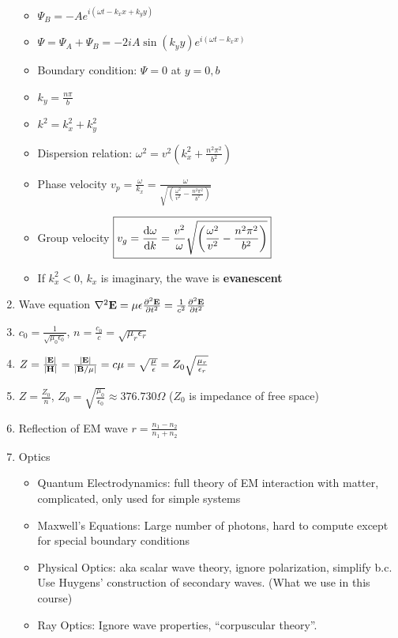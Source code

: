 \documentclass{article}
\theoremstyle{remark}
\theoremstyle{remark}
\begin{document}
\begin{enumerate}
\begin{itemize}
            \item $\Psi_B=-Ae^{i(\omega t-k_x x+k_y y)}$
            \item $\Psi=\Psi_A+\Psi_B=-2iA\sin(k_y y)e^{i(\omega t-k_x x)}$
            \item Boundary condition: $\Psi=0$ at $y=0,b$
            \item $k_y=\frac{n\pi}{b}$
            \item $k^2=k_x^2+k_y^2$
            \item Dispersion relation: $\boxed{\omega^2=v^2\left(k_x^2+\frac{n^2\pi^2}{b^2}\right)}$
            \item Phase velocity $\boxed{v_p=\frac{\omega}{k_x}=\frac{\omega}{\sqrt{\left(\frac{\omega^2}{v^2}-\frac{n^2\pi^2}{b^2}\right)}}}$
            \item Group velocity $\boxed{v_g=\dv{\omega}{k}=\frac{v^2}{\omega}\sqrt{\left(\frac{\omega^2}{v^2}-\frac{n^2\pi^2}{b^2}\right)}}$
            \item If $k_x^2<0$, $k_x$ is imaginary, the wave is \textbf{evanescent}
        \end{itemize}
    \item Wave equation $\laplacian{\vb{E}}=\mu\epsilon\pdv[2]{\vb{E}}{t}=\frac{1}{c^2}\pdv[2]{\vb{E}}{t}$
    \item $c_0=\frac{1}{\sqrt{\mu_0\epsilon_0}}$, $n=\frac{c_0}{c}=\sqrt{\mu_r\epsilon_r}$
    \item $Z=\frac{|\vb{E}|}{|\vb{H}|}=\frac{|\vb{E}|}{|\vb{B}/\mu|}=c\mu=\sqrt{\frac{\mu}{\epsilon}}=Z_0\sqrt{\frac{\mu_r}{\epsilon_r}}$
    \item $\boxed{Z=\frac{Z_0}{n}}$, $\boxed{Z_0=\sqrt{\frac{\mu_0}{\epsilon_0}}}\approx 376.730\Omega$ ($Z_0$ is impedance of free space)
    \item Reflection of EM wave $r=\frac{n_1-n_2}{n_1+n_2}$
    \item Optics\begin{itemize}
            \item Quantum Electrodynamics: full theory of EM interaction with matter, complicated, only used for simple systems
            \item Maxwell's Equations: Large number of photons, hard to compute except for special boundary conditions
            \item Physical Optics: aka scalar wave theory, ignore polarization, simplify b.c. Use Huygens' construction of secondary waves. (What we use in this course)
            \item Ray Optics: Ignore wave properties, ``corpuscular theory''.

\end{itemize}
\end{enumerate}
\end{document}
